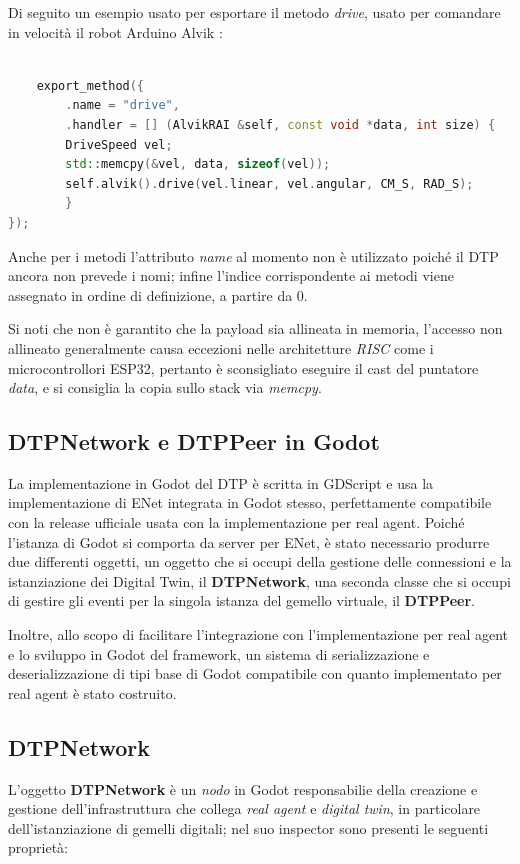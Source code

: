 Di seguito un esempio usato per esportare il metodo \textit{drive}, usato per comandare in velocità il robot Arduino Alvik :

\begin{lstlisting}[language=C++, caption=Esempio d'uso del metodo export\_method]	

	export_method({
		.name = "drive",
		.handler = [] (AlvikRAI &self, const void *data, int size) {
  		DriveSpeed vel;
  		std::memcpy(&vel, data, sizeof(vel));
  		self.alvik().drive(vel.linear, vel.angular, CM_S, RAD_S);
		}
});
\end{lstlisting}

Anche per i metodi l'attributo \textit{name} al momento non è utilizzato poiché il DTP ancora non prevede i nomi; infine l'indice corrispondente ai metodi viene assegnato in ordine di definizione, a partire da 0. 

Si noti che non è garantito che la payload sia allineata in memoria, l'accesso non allineato generalmente causa eccezioni nelle architetture \textit{RISC} come i microcontrollori ESP32, pertanto è sconsigliato eseguire il cast del puntatore \textit{data}, e si consiglia la copia sullo stack via \textit{memcpy}.
\subsection{DTPNetwork e DTPPeer in Godot}
La implementazione in Godot del DTP è scritta in GDScript e usa la implementazione di ENet integrata in Godot stesso, perfettamente compatibile con la release ufficiale usata con la implementazione per real agent. Poiché l'istanza di Godot si comporta da server per ENet, è stato necessario produrre due differenti oggetti, un oggetto che si occupi della gestione delle connessioni e la istanziazione dei Digital Twin, il \textbf{DTPNetwork}, una seconda classe che si occupi di gestire gli eventi per la singola istanza del gemello virtuale, il \textbf{DTPPeer}.

Inoltre, allo scopo di facilitare l'integrazione con l'implementazione per real agent e lo sviluppo in Godot del framework, un sistema di serializzazione e deserializzazione di tipi base di Godot compatibile con quanto implementato per real agent è stato costruito.

\subsection*{DTPNetwork}
L'oggetto \textbf{DTPNetwork} è un \textit{nodo} in Godot responsabilie della creazione e gestione dell'infrastruttura che collega \textit{real agent} e \textit{digital twin}, in particolare dell'istanziazione di gemelli digitali; nel suo inspector sono presenti le seguenti proprietà:

